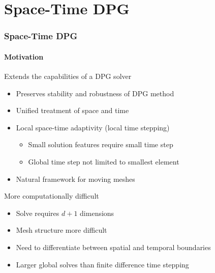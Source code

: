 \documentclass[18pt,xcolor=table]{beamer}
\begin{document}
\section{Space-Time DPG}


\begin{frame}[t]
\frametitle{Space-Time DPG}
\framesubtitle{Motivation}
Extends the capabilities of a DPG solver
\begin{itemize}
  \item Preserves stability and robustness of DPG method
  \item Unified treatment of space and time
  \item Local space-time adaptivity (local time stepping)
  \begin{itemize}
    \item Small solution features require small time step
    \item Global time step not limited to smallest element
  \end{itemize}
  \item Natural framework for moving meshes
\end{itemize}
\bigskip

More computationally difficult
\begin{itemize}
  \item Solve requires $d+1$ dimensions
  \item Mesh structure more difficult
  \item Need to differentiate between spatial and temporal boundaries
  \item Larger global solves than finite difference time stepping
\end{itemize}
\end{frame}
\end{document}
